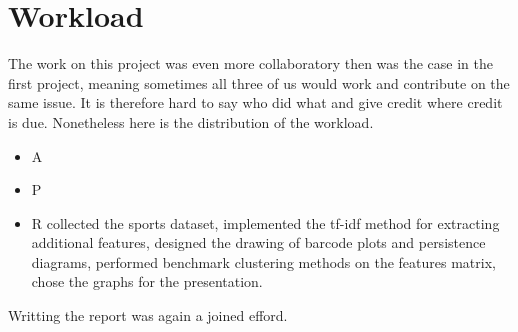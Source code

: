 \section{Workload} 
\label{sec:workload}

The work on this project was even more collaboratory then was the case in the first project, meaning sometimes all three of us would work and contribute on the same issue. It is therefore hard to say who did what and give credit where credit is due. Nonetheless here is the distribution of the workload.

\begin{itemize}
  \item A
  \item P
  \item R collected the sports dataset, implemented the tf-idf method for extracting additional features, designed the drawing of barcode plots and persistence diagrams, performed benchmark clustering methods on the features matrix, chose the graphs for the presentation.
\end{itemize}

Writting the report was again a joined efford.
